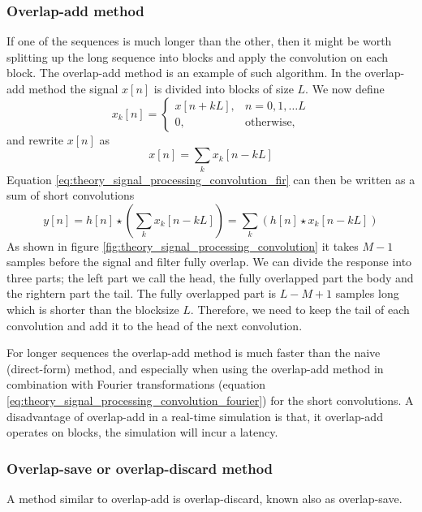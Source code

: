 \subsubsection{Overlap-add method}
If one of the sequences is much longer than the other, then it might be worth splitting up the long sequence into blocks and apply the convolution on each block.
The overlap-add method is an example of such algorithm. In the overlap-add method the signal $x[n]$ is divided into blocks of size $L$.
We now define
\begin{equation}
 x_k[n] =
 \begin{cases}
  x[n+kL], & n = 0,1,\dots L \\
  0, & \text{otherwise,}
 \end{cases}
\end{equation}
and rewrite $x[n]$ as
\begin{equation}
 x[n] = \sum_k x_k[n-kL]
\end{equation}
Equation \ref{eq:theory_signal_processing_convolution_fir} can then be written as a sum of short convolutions
\begin{equation}
y[n] = h[n] \star \left( \sum_k x_k[n-kL] \right) = \sum_k \left( h[n] \star x_k[n-kL] \right)
\end{equation}
As shown in figure \ref{fig:theory_signal_processing_convolution} it takes $M-1$
samples before the signal and filter fully overlap. We can divide the response
into three parts; the left part we call the head, the fully overlapped part the
body and the rightern part the tail. The fully overlapped part is $L-M+1$
samples long which is shorter than the blocksize $L$. Therefore, we need to keep
the tail of each convolution and add it to the head of the next convolution.

For longer sequences the overlap-add method is much faster than the naive
(direct-form) method, and especially when using the overlap-add method in
combination with Fourier transformations (equation
\ref{eq:theory_signal_processing_convolution_fourier}) for the short
convolutions. A disadvantage of overlap-add in a real-time simulation is that, it overlap-add operates on blocks, the simulation will incur a latency.

\subsubsection{Overlap-save or overlap-discard method}
A method similar to overlap-add is overlap-discard, known also as overlap-save.
\todo{}


